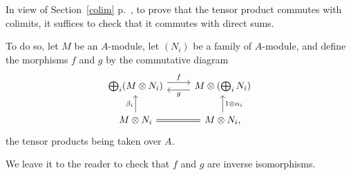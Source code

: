 \documentclass[parskip=half,fontsize=12pt]{scrartcl}%
\newcommand{\ds}{\displaystyle}
\begin{document}
%
\begin{comment}
Assume we have an inductive system $(M_i)$ of $A$-modules indexed by a category  $I$, that is, for each object $i$ of $I$ we have an $A$-module $M_i$, and for each morphism $f:d(f)\to c(f)$ in $I$ we have an $A$-linear map $M_f:M_{c(f)}\to M_{d(f)}$. 

Define the morphisms $u$ and $v$ by the commutative diagram
$$
\begin{tikzcd}
M_{d(f)}\ar[d,"\alpha_{f}"']\ar[r,equal]&M_{d(f)}\ar[d,"\beta_{d(f)}"]\\ 
\ds\bigoplus_gM_{d(g)}\ar[r,yshift=0.9ex,"u"]\ar[r,yshift=-0.9ex,"v"']&\ds\bigoplus_iM_i\\ 
M_{d(f)}\ar[u,"\alpha_{f}"]\ar[r,"M_f"']&M_{c(f),}\ar[u,"\beta_{c(f)}"']
\end{tikzcd}
$$ 
where the $\alpha_f$ and the $\beta_i$ are the coprojections. 

We claim that the cokernel of $u-v$ is a colimit of our system, or equivalently, that the middle row of the commutative diagram 
$$
\begin{tikzcd}
M_{d(f)}\ar[d,"\alpha_{f}"']\ar[r,equal]&M_{d(f)}\ar[d,"\beta_{d(f)}"]\\ 
\ds\bigoplus_gM_{d(g)}\ar[r,"u-v"]&\ds\bigoplus_iM_i\ar[r]&\ds\ooo{colim}_iM_i\ar[r]&0\\ 
M_{d(f)}\ar[u,"\alpha_{f}"]\ar[r,"M_f"']&M_{c(f)}\ar[u,"\beta_{c(f)}"']
\end{tikzcd}
$$ 
is exact. 

The proof is left to the reader. 
\end{comment}
%

In view of Section~\ref{colim} p.~\pageref{colim}, to prove that the tensor product commutes with colimits, it suffices to check that it commutes with direct sums. 

To do so, let $M$ be an $A$-module, let $(N_i)$ be a family of $A$-module, and define the morphisms $f$ and $g$ by the commutative diagram 
$$
\begin{tikzcd} 
\bigoplus_i(M\otimes N_i)\ar[r,yshift=0.9ex,"f"]\ar[r,leftarrow,yshift=-0.9ex,"g"']& M\otimes\left(\bigoplus_iN_i\right)\\ 
M\otimes N_i\ar[u,"\beta_i"]\ar[r,equal]&M\otimes N_i,\ar[u,"1\otimes\alpha_i"']
\end{tikzcd}
$$ 
the tensor products being taken over $A$.

We leave it to the reader to check that $f$ and $g$ are inverse isomorphisms.
\end{document}
